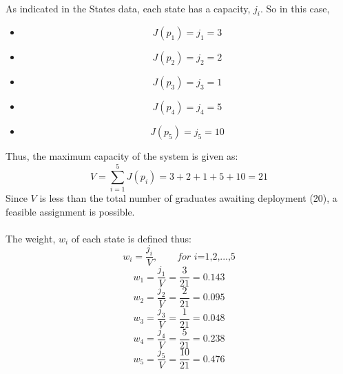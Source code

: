 \documentclass[a4paper,openany]{book}
\begin{document}
			\paragraph{}
				As indicated in the States data, each state has a capacity, $j_i$. So in this case,
				\begin{itemize}
					\item[ ] \[J(p_1) = j_1 = 3\]
					\item[ ] \[J(p_2) = j_2 = 2\]
					\item[ ] \[J(p_3) = j_3 = 1\]
					\item[ ] \[J(p_4) = j_4 = 5\]
					\item[ ] \[J(p_5) = j_5 = 10\]
				\end{itemize}
				Thus, the maximum capacity of the system is given as:
				\begin{equation}
					V = \sum_{i=1}^{5}{J(p_i)} = 3 + 2 + 1 + 5 + 10 = 21
				\end{equation}
			Since $V$ is less than the total number of graduates awaiting deployment (20), a feasible assignment is possible.
			\paragraph{}
				The weight, $w_i$ of each state is defined thus:
				\begin{equation}
					w_i = \frac{j_i}{V}, \qquad \textit{for i=1,2,...,5}
				\end{equation}
				\begin{equation}
					w_1 = \frac{j_1}{V} = \frac{3}{21} = 0.143
				\end{equation}
				\begin{equation}
					w_2 = \frac{j_2}{V} = \frac{2}{21} = 0.095
				\end{equation}
				\begin{equation}
					w_3 = \frac{j_3}{V} = \frac{1}{21} = 0.048
				\end{equation}
				\begin{equation}
					w_4 = \frac{j_4}{V} = \frac{5}{21} = 0.238
				\end{equation}
				\begin{equation}
					w_5 = \frac{j_5}{V} = \frac{10}{21} = 0.476
				\end{equation}
\end{document}
